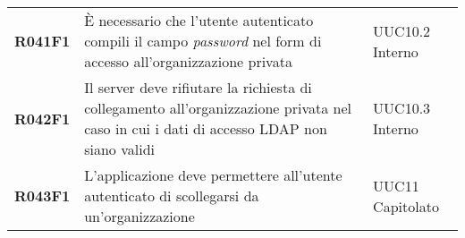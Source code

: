 \documentclass[../analisi-dei-requisiti.tex]{subfiles}
\begin{document}
\begin{longtable}[H]{>{\centering\bfseries}m{3cm} >{\centering}m{10cm} >{\centering\arraybackslash}m{3cm}}
  R041F1                               & È necessario che l'utente autenticato compili il campo \textit{password} nel form di accesso all'organizzazione privata                                                                                 & UUC10.2 Interno               \\
  R042F1                               & Il server deve rifiutare la richiesta di collegamento all'organizzazione privata nel caso in cui i dati di accesso LDAP non siano validi                                                                & UUC10.3 Interno               \\
  R043F1                               & L'applicazione deve permettere all'utente autenticato di scollegarsi da un'organizzazione                                                                                                               & UUC11 Capitolato              \\


\end{longtable}
\end{document}
